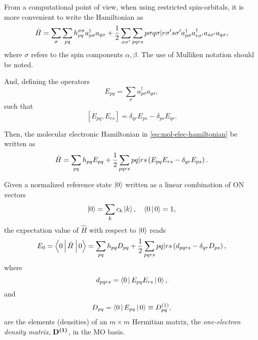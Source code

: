 \begin{comentario}
From a computational point of view, when using restricted spin-orbitals, it is
more convenient to write the Hamiltonian as
\begin{equation} \label{eq:mol-elec-hamiltonian}
    \hat{H} =
    \sum_{\sigma} 
    \sum_{pq} h_{pq}^{\sigma \sigma} a_{p \sigma}^{\dagger} a_{q \sigma}
    +
    \frac{1}{2} \sum_{\sigma \sigma^{\prime}} \sum_{pqrs} 
    \PBraket{p\sigma q \sigma | r\sigma^{\prime} s \sigma^{\prime}}
    a_{p \sigma}^{\dagger} a_{r \sigma^{\prime}}^{\dagger} a_{s \sigma^{\prime}} a_{q \sigma}
    ,
\end{equation}
where $\sigma$ refers to the spin components $\alpha, \beta$.
The use of Mulliken notation should be noted.

And, defining the operators 
\begin{equation}
    E_{pq} =
    \sum_{\sigma} a_{p\sigma}^{\dagger} a_{q\sigma}
    ,
\end{equation}
such that 
\begin{equation}
    \left[ E_{pq}, E_{rs} \right] =
    \delta_{qr} E_{ps} - \delta_{ps} E_{qr}
    .
\end{equation}

Then, the molecular electronic Hamiltonian in \cref{eq:mol-elec-hamiltonian} be written as 
\begin{equation}
    \hat{H} =
    \sum_{pq} h_{pq} E_{pq}
    + \frac{1}{2}
    \sum_{pqrs} \PBraket{pq | rs} \left( E_{pq} E_{rs} - \delta_{qr}E_{ps} \right)
    .
\end{equation}

Given a normalized reference state
$\Ket{0}$ written as a linear combination of ON vectors 
\begin{equation}
    \Ket{0} = \sum_{k} c_k \Ket{k}
    , \quad
    \Braket{0 | 0} = 1
    ,
\end{equation}
the expectation value of $\hat{H}$ with respect to $\Ket{0}$ reads
\begin{equation} \label{eq:GS-energy-1}
    E_0 = \Braket{0 | \hat{H} | 0} =
    \sum_{pq} h_{pq} D_{pq} + \frac{1}{2} \sum_{pqrs}
    \PBraket{pq | rs} \left( d_{pqrs} - \delta_{qr} D_{ps} \right)
    ,
\end{equation}
where 
\begin{equation}
    d_{pqrs} = \Braket{0 | E_{pq} E_{rs} | 0}
    ,
\end{equation}
and
\begin{equation} \label{eq:oedm-spin-representation}
    D_{pq} = \Braket{0 | E_{pq} | 0} \equiv \oedm_{pq}
    ,
\end{equation}
are the elements (densities) of an $m \times m$ Hermitian matrix, the
\textit{one-electron density matrix}, $ \mat{\oedm}$, in the MO basis.


\end{comentario}
